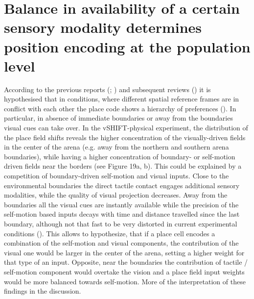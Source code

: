\section[Sensory availability determines position encoding at the population level]{Balance in availability of a certain sensory modality determines position encoding at the population level%
              }
\label{sec:balance_sm_vs_vision}

According to the previous reports (\cite{Mcnaughton1996}; \cite{Gothard2001}) and subsequent reviews (\cite{Maaswinkel1999}) it is hypothesised that in conditions, where different spatial reference frames are in conflict with each other the place code shows a hierarchy of preferences (\cite{Maaswinkel1999}). In particular, in absence of immediate boundaries or away from the boundaries visual cues can take over. In the vSHIFT-physical experiment, the distribution of the place field shifts reveals the higher concentration of the visually-driven fields in the center of the arena (e.g. away from the northern and southern arena boundaries), while having a higher concentration of boundary- or self-motion driven fields near the borders (see Figure 19a, b). This could be explained by a competition of boundary-driven self-motion and visual inputs. Close to the environmental boundaries the direct tactile contact engages additional sensory modalities, while the quality of visual projection decreases. Away from the boundaries all the visual cues are instantly available while the precision of the self-motion based inputs decays with time and distance travelled since the last boundary, although not that fast to be very distorted in current experimental conditions (\cite{Hardcastle2015}). This allows to hypothesize, that if a place cell encodes a combination of the self-motion and visual components, the contribution of the visual one would be larger in the center of the arena, setting a higher weight for that type of an input. Opposite, near the boundaries the contribution of tactile / self-motion component would overtake the vision and a place field input weights would be more balanced towards self-motion. More of the interpretation of these findings in the discussion.

